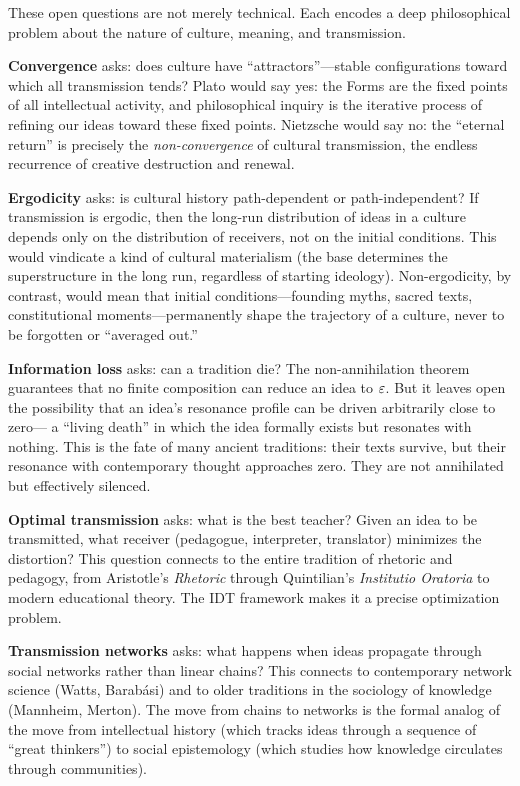 \begin{interpretation}\label{interp:ch7:open_questions_philosophy}
These open questions are not merely technical. Each encodes a deep
philosophical problem about the nature of culture, meaning, and
transmission.

\textbf{Convergence} asks: does culture have ``attractors''---stable
configurations toward which all transmission tends? Plato would say yes:
the Forms are the fixed points of all intellectual activity, and
philosophical inquiry is the iterative process of refining our ideas
toward these fixed points. Nietzsche would say no: the ``eternal return''
is precisely the \emph{non-convergence} of cultural transmission, the
endless recurrence of creative destruction and renewal.

\textbf{Ergodicity} asks: is cultural history path-dependent or
path-independent? If transmission is ergodic, then the long-run
distribution of ideas in a culture depends only on the distribution
of receivers, not on the initial conditions. This would vindicate a
kind of cultural materialism (the base determines the superstructure
in the long run, regardless of starting ideology). Non-ergodicity, by
contrast, would mean that initial conditions---founding myths, sacred
texts, constitutional moments---permanently shape the trajectory of
a culture, never to be forgotten or ``averaged out.''

\textbf{Information loss} asks: can a tradition die? The
non-annihilation theorem guarantees that no finite composition can
reduce an idea to $\varepsilon$. But it leaves open the possibility that
an idea's resonance profile can be driven arbitrarily close to zero---
a ``living death'' in which the idea formally exists but resonates
with nothing. This is the fate of many ancient traditions: their texts
survive, but their resonance with contemporary thought approaches
zero. They are not annihilated but effectively silenced.

\textbf{Optimal transmission} asks: what is the best teacher? Given
an idea to be transmitted, what receiver (pedagogue, interpreter,
translator) minimizes the distortion? This question connects to the
entire tradition of rhetoric and pedagogy, from Aristotle's
\emph{Rhetoric} through Quintilian's \emph{Institutio Oratoria} to
modern educational theory. The IDT framework makes it a precise
optimization problem.

\textbf{Transmission networks} asks: what happens when ideas propagate
through social networks rather than linear chains? This connects to
contemporary network science (Watts, Barabási) and to older traditions
in the sociology of knowledge (Mannheim, Merton). The move from chains
to networks is the formal analog of the move from intellectual history
(which tracks ideas through a sequence of ``great thinkers'') to
social epistemology (which studies how knowledge circulates through
communities).
\end{interpretation}

